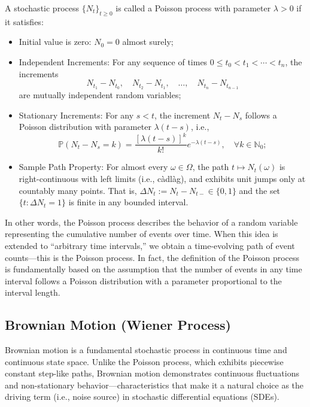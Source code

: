 \documentclass{article}
\begin{document}
\begin{definition}
A stochastic process $\{N_t\}_{t \geq 0}$ is called a Poisson process with parameter $\lambda > 0$ if it satisfies:
\begin{itemize}
    \item Initial value is zero: $N_0 = 0$ almost surely;
    \item Independent Increments: For any sequence of times $0 \leq t_0 < t_1 < \cdots < t_n$, the increments
    \[
    N_{t_1} - N_{t_0},\quad N_{t_2} - N_{t_1},\quad \dots,\quad N_{t_n} - N_{t_{n-1}}
    \]
    are mutually independent random variables;
    \item Stationary Increments: For any $s < t$, the increment $N_t - N_s$ follows a Poisson distribution with parameter $\lambda(t - s)$, i.e.,
    \[
    \mathbb{P}(N_t - N_s = k) = \frac{[\lambda(t - s)]^k}{k!} e^{-\lambda(t - s)}, \quad \forall k \in \mathbb{N}_0;
    \]
    \item Sample Path Property: For almost every $\omega \in \Omega$, the path $t \mapsto N_t(\omega)$ is right-continuous with left limits (i.e., càdlàg), and exhibits unit jumps only at countably many points. That is, $\Delta N_t := N_t - N_{t-} \in \{0, 1\}$ and the set $\{t : \Delta N_t = 1\}$ is finite in any bounded interval.
\end{itemize}
\end{definition}

In other words, the Poisson process describes the behavior of a random variable representing the cumulative number of events over time. When this idea is extended to “arbitrary time intervals,” we obtain a time-evolving path of event counts—this is the Poisson process. In fact, the definition of the Poisson process is fundamentally based on the assumption that the number of events in any time interval follows a Poisson distribution with a parameter proportional to the interval length.

\subsection{Brownian Motion (Wiener Process)}

Brownian motion is a fundamental stochastic process in continuous time and continuous state space. Unlike the Poisson process, which exhibits piecewise constant step-like paths, Brownian motion demonstrates continuous fluctuations and non-stationary behavior—characteristics that make it a natural choice as the driving term (i.e., noise source) in stochastic differential equations (SDEs).
\end{document}
